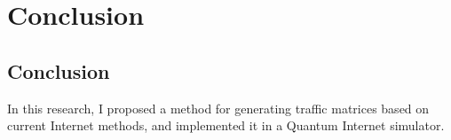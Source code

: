 \chapter{Conclusion}
\label{conclusion}
\section{Conclusion}
In this research, I proposed a method for generating traffic matrices based on current Internet methods, and implemented it in a Quantum Internet simulator.


